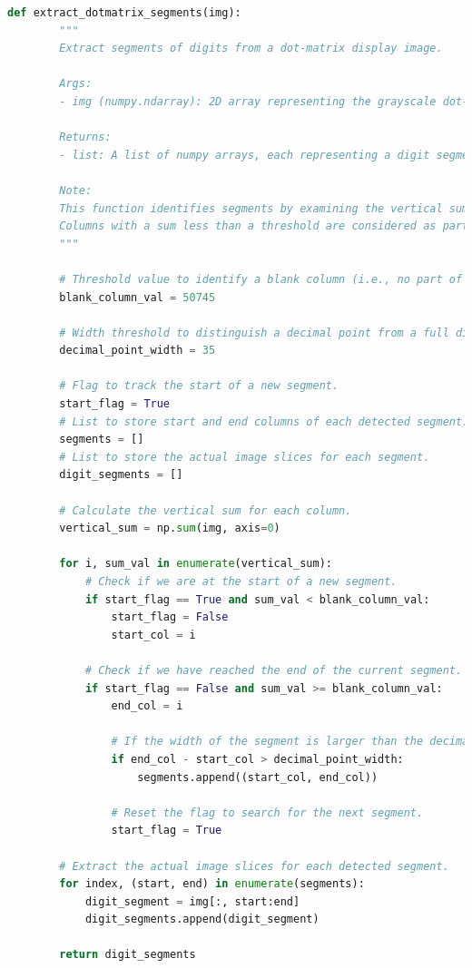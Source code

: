 \begin{singlespacing}
    \begin{lstlisting}[language=Python, caption=Extract Dot Matrix Digits]
    def extract_dotmatrix_segments(img):
        """
        Extract segments of digits from a dot-matrix display image.

        Args:
        - img (numpy.ndarray): 2D array representing the grayscale dot-matrix image.

        Returns:
        - list: A list of numpy arrays, each representing a digit segment in the image.

        Note:
        This function identifies segments by examining the vertical sum of each column in the image.
        Columns with a sum less than a threshold are considered as part of a digit segment.
        """

        # Threshold value to identify a blank column (i.e., no part of a digit).
        blank_column_val = 50745

        # Width threshold to distinguish a decimal point from a full digit.
        decimal_point_width = 35

        # Flag to track the start of a new segment.
        start_flag = True
        # List to store start and end columns of each detected segment.
        segments = []
        # List to store the actual image slices for each segment.
        digit_segments = []

        # Calculate the vertical sum for each column.
        vertical_sum = np.sum(img, axis=0)

        for i, sum_val in enumerate(vertical_sum):
            # Check if we are at the start of a new segment.
            if start_flag == True and sum_val < blank_column_val:
                start_flag = False
                start_col = i

            # Check if we have reached the end of the current segment.
            if start_flag == False and sum_val >= blank_column_val:
                end_col = i

                # If the width of the segment is larger than the decimal point width, consider it as a digit segment.
                if end_col - start_col > decimal_point_width:
                    segments.append((start_col, end_col))

                # Reset the flag to search for the next segment.
                start_flag = True

        # Extract the actual image slices for each detected segment.
        for index, (start, end) in enumerate(segments):
            digit_segment = img[:, start:end]
            digit_segments.append(digit_segment)

        return digit_segments
\end{lstlisting}
\end{singlespacing}




